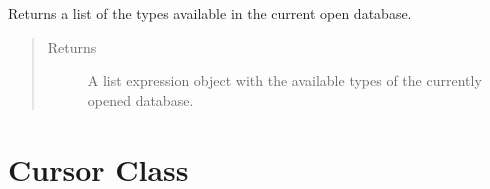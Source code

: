 \documentclass[letterpaper,10pt,english]{sphinxmanual}
\begin{document}
\begin{fulllineitems}
\begin{fulllineitems}
\begin{quote}
\begin{description}
\end{description}\end{quote}

\end{fulllineitems}


\begin{fulllineitems}
\label{\detokenize{index:secondodb.api.secondoapi.Connection.get_list_types}}
Returns a list of the types available in the current open database.
\begin{quote}\begin{description}
\item[{Returns}] \leavevmode
A list expression object with the available types of the currently opened database.

\end{description}\end{quote}

\end{fulllineitems}


\end{fulllineitems}



\section{Cursor Class}
\label{\detokenize{index:cursor-class}}
\end{document}

